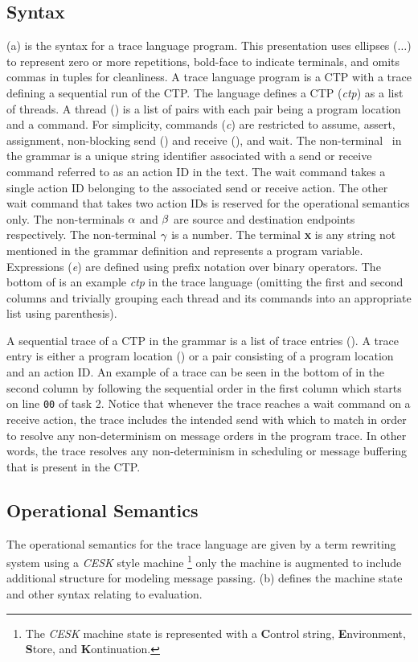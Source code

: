 \subsection{Syntax}
(a) is the syntax for a trace language program.
This presentation uses ellipses ($\ldots$) to represent zero or more
repetitions, bold-face to indicate terminals, and omits commas in tuples for cleanliness. A trace language
program is a CTP with a trace defining a sequential run of the CTP.
The language defines a CTP (\textit{ctp}) as a list of threads.  A
thread (\thread) is a list of pairs with each pair being a program
location and a command.  For simplicity, commands (\textit{c}) are
restricted to assume, assert, assignment, non-blocking send (\snd) and
receive (\rcv), and wait.  The non-terminal \aid\ in the grammar is a
unique string identifier associated with a send or receive command
referred to as an action ID in the text.  The wait command takes a
single action ID belonging to the associated send or receive action.
The other wait command that takes two action IDs is reserved for the
operational semantics only.  The non-terminals $\alpha$ and $\beta$ are
source and destination endpoints respectively.  The non-terminal $\mathbf{\gamma}$
is a number.  The terminal \textbf{x} is any string not mentioned in
the grammar definition and represents a program variable.    Expressions (\textit{e}) are defined
using prefix notation over binary operators.  The bottom of
 is an example \textit{ctp} in the trace language
(omitting the first and second columns and trivially grouping each
thread and its commands into an appropriate list using parenthesis).

A sequential trace of a CTP in the grammar is a list of trace entries
(\traceentry).  A trace entry is either a program location (\ploc) or
a pair consisting of a program location and an action ID.  An example
of a trace can be seen in the bottom of  in the
second column by following the sequential order in the first column
which starts on line \texttt{00} of task 2.  Notice that whenever the
trace reaches a wait command on a receive action, the trace includes
the intended send with which to match in order to resolve any
non-determinism on message orders in the program trace.  In other
words, the trace resolves any non-determinism in scheduling or
message buffering that is present in the CTP.

\subsection{Operational Semantics}
The operational semantics for the trace language are given by a term
rewriting system using a \textit{CESK} style machine
\footnote{The \textit{CESK} machine state is represented with a \textbf{C}ontrol string,
  \textbf{E}nvironment, \textbf{S}tore, and \textbf{K}ontinuation.}
only the machine is augmented to include additional structure for
modeling message passing. (b) defines the machine
state and other syntax relating to evaluation. 

